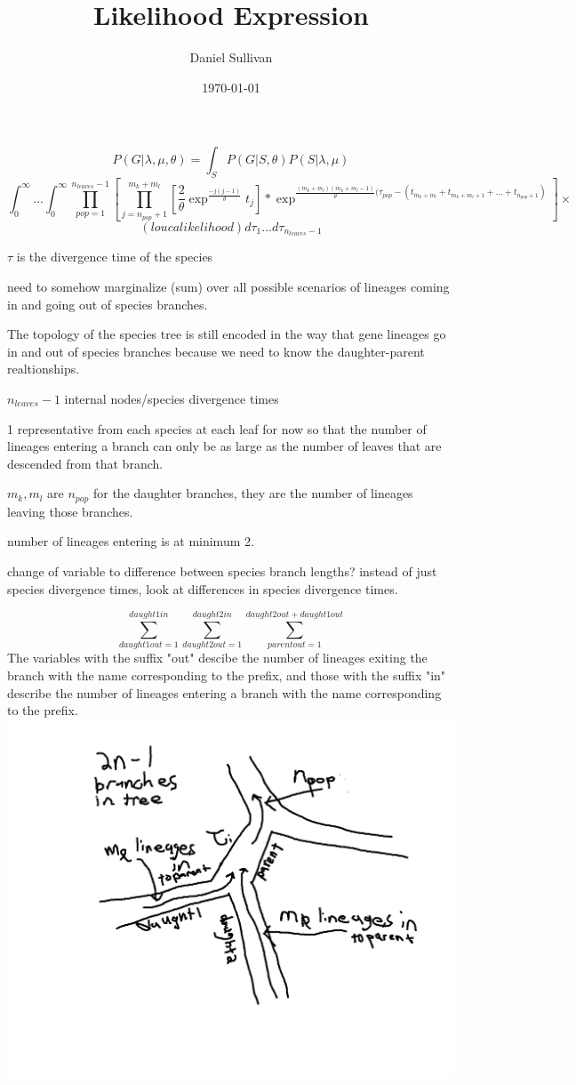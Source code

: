 \documentclass[12pt]{article}
\begin{document}
\title{Likelihood Expression}
\author{Daniel Sullivan}
\date{\today}
\maketitle


$$P(G|\lambda,\mu,\theta)=\int_{S}^{}P(G|S,\theta)P(S|\lambda,\mu)$$
$$\int_{0}^{\infty}...\int_{0}^{\infty}\prod_{pop=1}^{n_{leaves}-1}\left[\prod_{j=n_{pop}+1}^{m_k+m_l}\left[\frac{2}{\theta}\exp^{\frac{-j(j-1)}{\theta}}t_j\right]*\exp^{\frac{(m_k+m_l)(m_k+m_l-1)}{\theta}(\tau_{pop}-(t_{m_k+m_l}+t_{m_k+m_l+1}+...+t_{n_{pop}+1})}\right]\times $$
$$(loucalikelihood)d\tau_1...d\tau_{n_{leaves}-1}$$

$\tau$ is the divergence time of the species

need to somehow  marginalize (sum) over all possible scenarios of lineages coming in and going out of species branches. 

The topology of the species tree is still encoded in the way that gene lineages go in and out of species branches because we need to know the daughter-parent realtionships.  

$n_{leaves}-1$ internal nodes/species divergence times

1 representative from each species at each leaf for now so that the number of lineages entering a branch can only be as large as the number of leaves that are descended from that branch. 

$m_k,m_l$ are $n_{pop}$ for the daughter branches, they are the number of lineages leaving those branches.

number of lineages entering is at minimum 2. 

change of variable to difference between species branch lengths? instead of just species divergence times, look at differences in species divergence times. 

$$\sum_{daught1out=1}^{daught1in}\sum_{daught2out=1}^{daught2in}\sum_{parentout=1}^{daught2out+daught1out}$$
The variables with the suffix "out" descibe the number of lineages exiting the branch with the name corresponding to the prefix, and those with the suffix "in" describe the number of lineages entering a branch with the name corresponding to the prefix.
\newline
\includegraphics[scale=0.4]{coalescentdrawings.png}
\end{document}
